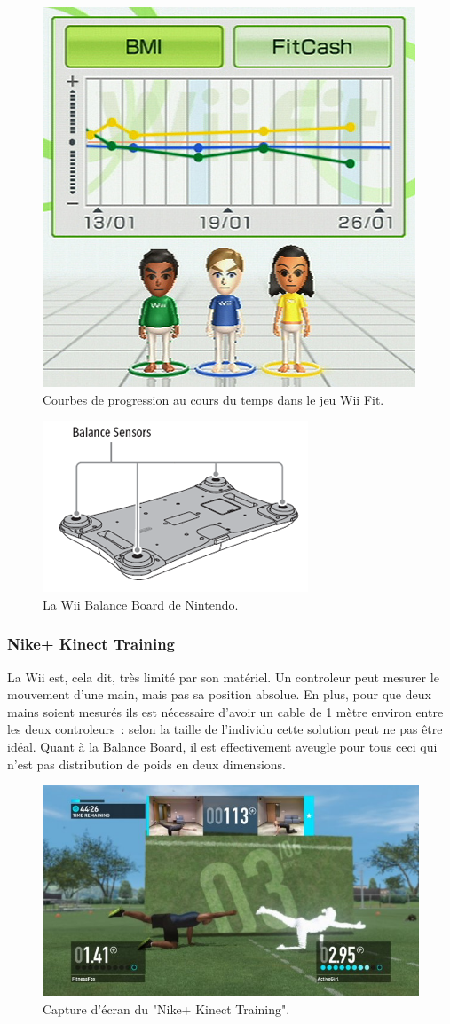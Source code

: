\begin{figure}[h!]
\centering
\includegraphics[width=0.5\linewidth]{images/wii_fit}
\caption{Courbes de progression au cours du temps dans le jeu Wii Fit.}
\label{fig:wii_fit}
\end{figure}

\begin{figure}[h!]
\centering
\includegraphics[width=0.5\linewidth]{images/balance_board}
\caption{La Wii Balance Board de Nintendo.}
\label{fig:balance_board}
\end{figure}

\subsubsection{Nike+ Kinect Training}

La Wii est, cela dit, très limité par son matériel. Un controleur peut mesurer
le mouvement d'une main, mais pas sa position absolue. En plus, pour que deux 
mains soient
mesurés ils est nécessaire d'avoir un cable de 1 mètre environ entre les deux
controleurs~: selon la taille de l'individu cette solution peut ne pas être
idéal. Quant à la Balance Board, il est effectivement aveugle pour tous ceci qui
n'est pas distribution de poids en deux dimensions.

\begin{figure}[h!]
\centering
\includegraphics[width=0.8\linewidth]{images/nike_kinect}
\caption{Capture d'écran du "Nike+ Kinect Training".}
\end{figure}

